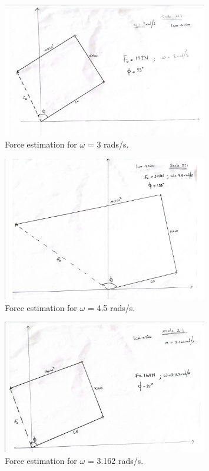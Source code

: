 \documentclass[12pt,a4paper]{article}
\begin{document}
\begin{figure}[H]
    \centering
    \includegraphics[width=0.8\textwidth]{3rads.png} 
    \caption{Force estimation for $\omega$ = 3 rads/s.}
    \label{fig:system}
\end{figure}

\begin{figure}[H]
    \centering
    \includegraphics[width=0.8\textwidth]{4.5rads.png} 
    \caption{Force estimation for $\omega$ = 4.5 rads/s.}
    \label{fig:system}
\end{figure}

\begin{figure}[H]
    \centering
    \includegraphics[width=0.8\textwidth]{3.162rads.png} 
    \caption{Force estimation for $\omega$ = 3.162 rads/s.}
    \label{fig:system}
\end{figure}
\end{document}
